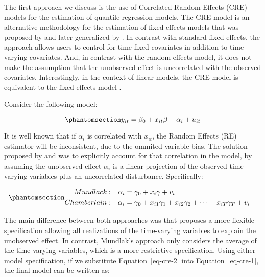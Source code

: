 \documentclass[bib]{statapress}
\begin{document}
The first approach we discuss is the use of Correlated Random Effects
(CRE) models for the estimation of quantile regression models. The CRE
model is an alternative methodology for the estimation of fixed effects
models that was proposed by \citet{mundlak1978} and later generalized by
\citet{chamberlain1982}. In contrast with standard fixed effects, the
approach allows users to control for time fixed covariates in addition
to time-varying covariates. And, in contrast with the random effects
model, it does not make the assumption that the unobserved effect is
uncorrelated with the observed covariates. Interestingly, in the context
of linear models, the CRE model is equivalent to the fixed effects model
\citep{wooldridge2010}.

Consider the following model:

\begin{equation}\phantomsection\label{eq-cre-1}{y_{it} = \beta_0 + x_{it}\beta  + \alpha_i + u_{it}
}\end{equation}

It is well known that if \(\alpha_i\) is correlated with \(x_{it}\), the
Random Effects (RE) estimator will be inconsistent, due to the ommited
variable bias. The solution proposed by \citet{mundlak1978} and
\citet{chamberlain1982} was to explicitly account for that correlation
in the model, by assuming the unobserved effect \(\alpha_i\) is a linear
projection of the observed time-varying variables plus an uncorrelated
disturbance. Specifically:

\begin{equation}\phantomsection\label{eq-cre-2}{\begin{aligned}
Mundlack:  & & \alpha_i &= \gamma_0 + \bar x_{i}\gamma + v_i&  \\
Chamberlain: & & \alpha_i &= \gamma_0 + x_{i1}\gamma_1 + x_{i2}\gamma_2 + \dots + x_{iT}\gamma_T + v_i 
\end{aligned}
}\end{equation}

The main difference between both approaches was that
\citet{chamberlain1982} proposes a more flexible specification allowing
all realizations of the time-varying variables to explain the unobserved
effect. In contrast, Mundlak's approach only considers the average of
the time-varying variables, which is a more restrictive specification.
Using either model specification, if we substitute
Equation~\ref{eq-cre-2} into Equation~\ref{eq-cre-1}, the final model
can be written as:
\end{document}
